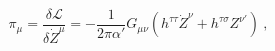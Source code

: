 \begin{equation} \label{eq:canon-momenta}
\pi_\mu = \frac{\delta\mathcal{L}}{\delta \dot Z^\mu} =
          -\frac{1}{2\pi\alpha'}G_{\mu\nu} \left(
          h^{\tau\tau} \dot Z^\nu + h^{\tau\sigma} Z^{\nu\prime}
          \right) \ ,
\end{equation}

